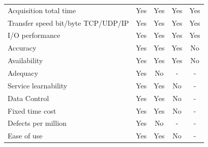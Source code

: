 \documentclass[conference]{IEEEtran}
\begin{document}
\begin{table}[]
\begin{tabular}{@{}lcccc@{}}
Acquisition total time                          & Yes                                     & Yes                                     & Yes                                     & Yes                         \\
Transfer speed bit/byte TCP/UDP/IP   & Yes                                     & Yes                                     & Yes                                     & Yes                         \\
I/O performance                                & Yes                                     & Yes                                     & Yes                                     & Yes                         \\
Accuracy                                          & Yes                                     & Yes                                     & Yes                                     & \cellcolor[HTML]{EA9999}No \\
Availability                                   & Yes                                     & Yes                                     & Yes                                     & \cellcolor[HTML]{EA9999}No \\
Adequacy                                         & Yes                                     & \cellcolor[HTML]{EA9999}No             & \cellcolor[HTML]{EA9999}-               & \cellcolor[HTML]{EA9999}-   \\
Service learnability                       & Yes                                     & Yes                                     & \cellcolor[HTML]{EA9999}No             & \cellcolor[HTML]{EA9999}-   \\
Data Control                                 & Yes                                     & Yes                                     & \cellcolor[HTML]{EA9999}No             & \cellcolor[HTML]{EA9999}-   \\
Fixed time cost                              & Yes                                     & Yes                                     & \cellcolor[HTML]{EA9999}No             & \cellcolor[HTML]{EA9999}-   \\
Defects per million                               & Yes                                     & \cellcolor[HTML]{EA9999}No             & \cellcolor[HTML]{EA9999}-               & \cellcolor[HTML]{EA9999}-   \\
Ease of use                                 & Yes                                     & Yes                                     & \cellcolor[HTML]{EA9999}No             & \cellcolor[HTML]{EA9999}-   \\

\end{tabular}
\end{table}
\end{document}
